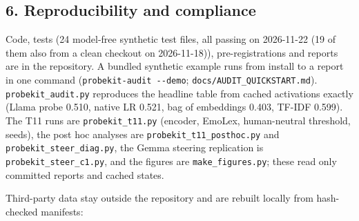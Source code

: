\documentclass[
  10pt,
]{article}
\begin{document}
\subsection{6. Reproducibility and
compliance}\label{6-reproducibility-and-compliance}

Code, tests (24 model-free synthetic test files, all passing on
2026-11-22 (19 of them also from a clean checkout on 2026-11-18)),
pre-registrations and reports are in the repository. A bundled synthetic
example runs from install to a report in one command
(\texttt{probekit-audit\ -\/-demo}; \texttt{docs/AUDIT\_QUICKSTART.md}).
\texttt{probekit\_audit.py} reproduces the headline table from cached
activations exactly (Llama probe 0.510, native LR 0.521, bag of
embeddings 0.403, TF-IDF 0.599). The T11 runs are
\texttt{probekit\_t11.py} (encoder, EmoLex, human-neutral threshold,
seeds), the post hoc analyses are \texttt{probekit\_t11\_posthoc.py} and
\texttt{probekit\_steer\_diag.py}, the Gemma steering replication is
\texttt{probekit\_steer\_c1.py}, and the figures are
\texttt{make\_figures.py}; these read only committed reports and cached
states.

Third-party data stay outside the repository and are rebuilt locally
from hash-checked manifests:
\end{document}
